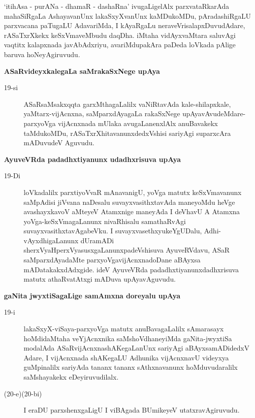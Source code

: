 \noindent
`itihAsa - purANa - dhamaR - dashaRna' ivugaLigelAlx parxvataRkarAda mahaSiRgaLa Ashaya\-vanUnx lakaSxyX\-vanUnx kaMDukoMDu, pAradashiRgaLU parxvacana paTugaLU AdavariMda, I kAyaRgaLu neraveVrisa\-lapxDu\-vu\-dAdare, rASaTxrXkekx keSxVmaveMbudu daqDha. iMtaha vidAyxvaMtara saluvAgi vaqtitx kalapxnada javA\-bAdx\-riyu, avariMdupakAra paDeda loVkada pAlige baruva hoNeyAgiruvudu.

{\bigskip
\noindent
{\large\bf ASaRvideyxkalegaLa saMrakaSxNege upAya}}\label{page50a}
\begin{description}
\item[19-si] ASaRsaMsakxqqta garxMthagaLalilx vaNiRtavAda kale-shilapxkale, yaMtarx-vijAcnxna, saMparxdAyagaLa rakaSx\-Nege upAyavAvudeMdare-parxyoVga vijAcnxnada mUlaka avugaLanenxlAlx anuBavakekx taMdu\-koMDu, rASaTxrXhitavanunxdedxVshisi sariyAgi suparxcAra mADuvudeV Aguvudu.
\end{description}

{\bigskip
\noindent
{\large\bf AyuveVRda padadhxtiyanunx udadhxrisuva upAya}}\label{page50b}
\begin{description}
\item[19-Di] loVkadalilx parxtiyoVvaR mAnavanigU, yoVga matutx keSxVmavanunx saMpA\-disi jiVvana naDe\-salu suvayxvasithxtavAda maneyoMdu heVge avashayxkavoV aMteyeV Atamxnige maneyAda I deVhavU A Atamxna yoVga-keSxVma\-gaLanunx nivaRhisalu samathaRvAgi suvayxvasithxtavAgabeVku. I suvayxva\-sethxyu\break keY\-gUDalu, Adhi-vAyxdhigaLanunx dUramADi sherxVyaHperxVyasusxgaLanunxpa\-deVshi\-suva Ayu\-veRVdavu, ASaR saMparxdAyadaMte parxyoVgavijAcnxnadoDane aBAyxsa mADatakakxdAdxgide. ideV AyuveVRda padadhxtiyanunxdadhxrisuva matutx athaRvatAtxgi mADuva upAyavAguvudu.
\end{description}

\newpage

{\bigskip
\noindent
{\large\bf gaNita jwyxtiSagaLige samAmxna doreyalu upAya}}\label{page51}
\begin{description}
\item[19-i] lakaSxyX-viSaya-parxyoVga matutx anuBavagaLalilx sAmarasayx hoMdidaMtaha veYjAcnxnika saMshoV\-dhaneyiMda gaNita-jwyxtiSa modalAda \hbox{ASaRvijAcnxna}\break shAKegaLanUnx sariyAgi aBAyxsamADidedxV Adare, I vijAcnxnada shAKegaLU Adhunika vijAcnxnavU videyxya guMpinalilx sariyAda tananx tananx sAthxnavanunx hoMdu\-vudaralilx saMshayakekx eDeyiruvudilalx.

\item[(20-e)(20-bi)] I eraDU parxshenxgaLigU I viBAgada BUmikeyeV utatxra\-vAgiruvudu.
\end{description}

